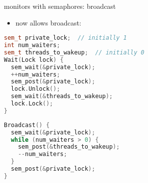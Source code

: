 \begin{frame}[fragile,label=monitorWithSemaphoreCVA3]{monitors with semaphores: broadcast}
\begin{itemize}
\item now allows broadcast:
\end{itemize}
\begin{minipage}{0.45\textwidth}
\begin{lstlisting}[language=C++,basicstyle=\fontsize{9.5}{10.5}\tt\selectfont]
sem_t private_lock;  // initially 1
int num_waiters;
sem_t threads_to_wakeup;  // initially 0
Wait(Lock lock) {
  sem_wait(&private_lock);
  ++num_waiters;
  sem_post(&private_lock);
  lock.Unlock();
  sem_wait(&threads_to_wakeup);
  lock.Lock();
}
\end{lstlisting}
\end{minipage}
\begin{minipage}{0.45\textwidth}
\begin{lstlisting}[language=C++,basicstyle=\fontsize{9.5}{10.5}\tt\selectfont]
Broadcast() {
  sem_wait(&private_lock);
  while (num_waiters > 0) {
    sem_post(&threads_to_wakeup);
    --num_waiters;
  }
  sem_post(&private_lock);
}
\end{lstlisting}
\end{minipage}
\end{frame}

